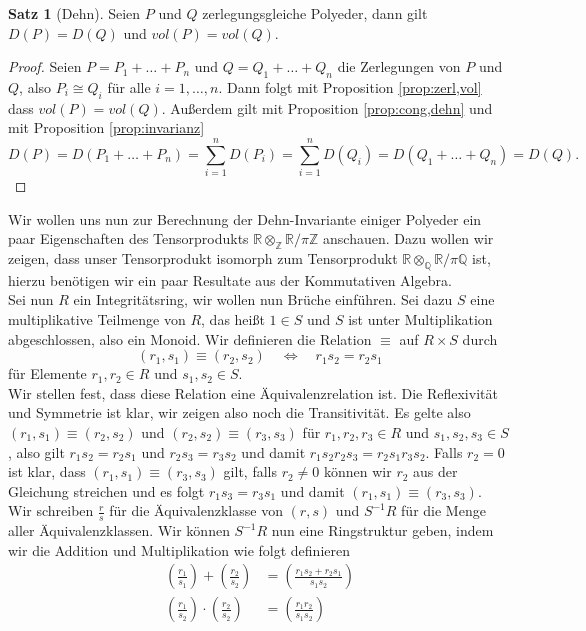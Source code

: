 \documentclass[11pt,titlepage]{article}
\newcommand{\setZ}{\mathbb{Z}}
\newcommand{\setQ}{\mathbb{Q}}
\newcommand{\setR}{\mathbb{R}}
\theoremstyle{definition}
\newtheorem{theorem}{Satz}[section]
\theoremstyle{remark}
\begin{document}
	\begin{theorem}[Dehn] \label{thm:dehn}
		Seien $P$ und $Q$ zerlegungsgleiche Polyeder, dann gilt $D(P)=D(Q)$ und $vol(P)=vol(Q)$.
	\end{theorem}
	
	\begin{proof}
		Seien $P=P_1+\ldots+P_n$ und $Q=Q_1+\ldots+Q_n$ die Zerlegungen von $P$ und 
		$Q$, also $P_i\cong Q_i$ für alle $i=1,\ldots,n$. Dann folgt mit Proposition \ref{prop:zerl,vol}
		dass $vol(P)=vol(Q)$. Außerdem gilt mit Proposition \ref{prop:cong,dehn}
		und mit Proposition \ref{prop:invarianz}
		\[D(P)=D(P_1+\ldots+P_n)=\sum_{i=1}^n D(P_i) =\sum_{i=1}^n D(Q_i)=D(Q_1+\ldots+Q_n)=D(Q).\]
	\end{proof}
	
	Wir wollen uns nun zur Berechnung der Dehn-Invariante einiger Polyeder ein paar Eigenschaften des Tensorprodukts $\setR\otimes_{\setZ}\setR /\pi\setZ$ anschauen. Dazu wollen wir zeigen, dass unser Tensorprodukt isomorph zum Tensorprodukt  
	$\setR\otimes_{\setQ}\setR /\pi\setQ$ ist, hierzu benötigen wir ein 
	paar Resultate 
	aus der Kommutativen Algebra. \\
	Sei nun $R$ ein Integritätsring, wir wollen nun 
	Brüche einführen. Sei dazu $S$ eine multiplikative Teilmenge von $R$, das heißt  
	$1\in S$ und $S$ ist unter Multiplikation abgeschlossen, also ein Monoid. Wir 
	definieren die Relation $\equiv$ auf $R\times S$ durch
	\[(r_1,s_1)\equiv(r_2,s_2)\quad \Leftrightarrow\quad r_1 s_2 =r_2 s_1\]
	für Elemente $r_1,r_2\in R$ und $s_1,s_2\in S$. \\
	Wir stellen fest, dass diese Relation  eine Äquivalenzrelation ist. Die 
	Reflexivität und Symmetrie ist klar, wir zeigen also noch die Transitivität.
	Es gelte also $(r_1,s_1)\equiv(r_2,s_2)$ und $(r_2,s_2)\equiv(r_3,s_3)$ für 
	$r_1,r_2,r_3\in R$ und $s_1,s_2,s_3\in S$, also gilt $r_1 s_2= r_2 s_1$ und 
	$r_2 s_3 =r_3 s_2$ und damit $r_1 s_2 r_2 s_3 =r_2 s_1 r_3 s_2$. Falls $r_2=0$ 
	ist klar, dass $(r_1,s_1)\equiv(r_3,s_3)$ gilt, falls $r_2\neq 0$ können wir $r_2$ aus der Gleichung streichen und es folgt 
	$r_1 s_3=r_3 s_1$ und damit $(r_1,s_1)\equiv(r_3,s_3)$. \\
	Wir schreiben $\frac{r}{s}$ für die Äquivalenzklasse von $(r,s)$ und $S^{-1}R$ 
	für die Menge aller Äquivalenzklassen. Wir können $S^{-1}R$ nun eine Ringstruktur geben, indem wir die Addition und Multiplikation wie folgt definieren
	\begin{align*}
		\left(\frac{r_1}{s_1}\right)+\left(\frac{r_2}{s_2}\right)
		&=\left(\frac{r_1s_2+r_2s_1}{s_1s_2}\right) \\
		\left(\frac{r_1}{s_2}\right)\cdot\left(\frac{r_2}{s_2}\right)
		&=\left(\frac{r_1r_2}{s_1s_2}\right)
	\end{align*}
\end{document}
